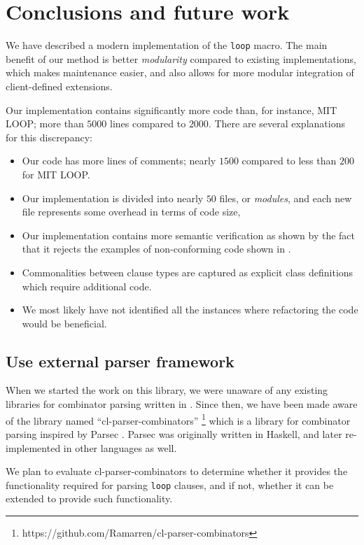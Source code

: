 \section{Conclusions and future work}

We have described a modern implementation of the \commonlisp{}
\texttt{loop} macro.  The main benefit of our method is better
\emph{modularity} compared to existing implementations, which makes
maintenance easier, and also allows for more modular integration of
client-defined extensions.

Our implementation contains significantly more code than, for
instance, MIT LOOP; more than $5000$ lines compared to $2000$.  There
are several explanations for this discrepancy:

\begin{itemize}
\item Our code has more lines of comments; nearly $1500$ compared to
  less than $200$ for MIT LOOP.
\item Our implementation is divided into nearly $50$ files, or
  \emph{modules}, and each new file represents some overhead in terms
  of code size,
\item Our implementation contains more semantic verification as shown
  by the fact that it rejects the examples of non-conforming code shown
  in .
\item Commonalities between clause types are captured as explicit
  class definitions which require additional code.
\item We most likely have not identified all the instances where
  refactoring the code would be beneficial.
\end{itemize}

\subsection{Use external parser framework}

When we started the work on this library, we were unaware of any
existing libraries for combinator parsing written in \commonlisp{}.
Since then, we have been made aware of the library named
``cl-parser-combinators''%
\footnote{https://github.com/Ramarren/cl-parser-combinators} which is
a library for combinator parsing inspired by Parsec
\cite{Leijen:Meijer:Parsec}.  Parsec was originally written in
Haskell, and later re-implemented in other languages as well.

We plan to evaluate cl-parser-combinators to determine whether it
provides the functionality required for parsing \texttt{loop} clauses,
and if not, whether it can be extended to provide such functionality.

